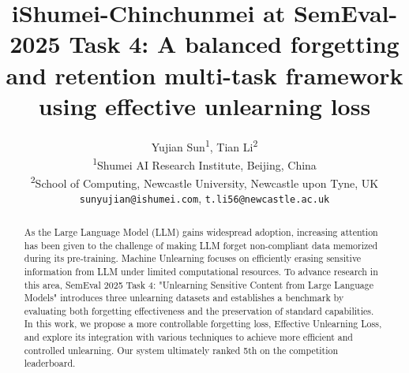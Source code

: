 \documentclass[11pt]{article}
\title{iShumei-Chinchunmei at SemEval-2025 Task 4: A balanced forgetting and retention multi-task framework using effective unlearning loss}
\author{
  Yujian Sun\textsuperscript{1},
  Tian Li\textsuperscript{2}
\\
  \textsuperscript{1}Shumei AI Research Institute, Beijing, China\\
  \textsuperscript{2}School of Computing, Newcastle University, Newcastle upon Tyne, UK
\\
  \texttt{sunyujian@ishumei.com},
  \texttt{t.li56@newcastle.ac.uk}
}
\begin{document}
\maketitle
\begin{abstract}




As the Large Language Model (LLM) gains widespread adoption, increasing attention has been given to the challenge of making LLM forget non-compliant data memorized during its pre-training. Machine Unlearning focuses on efficiently erasing sensitive information from LLM under limited computational resources. To advance research in this area, SemEval 2025 Task 4: "Unlearning Sensitive Content from Large Language Models" introduces three unlearning datasets and establishes a benchmark by evaluating both forgetting effectiveness and the preservation of standard capabilities. In this work, we propose a more controllable forgetting loss, Effective Unlearning Loss, and explore its integration with various techniques to achieve more efficient and controlled unlearning. Our system ultimately ranked 5th on the competition leaderboard.

\end{abstract}
\end{document}
